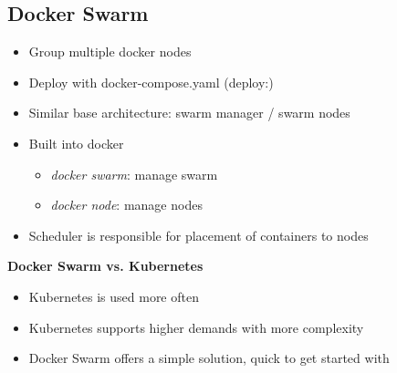 \subsection{Docker Swarm}
\begin{itemize}
    \item Group multiple docker nodes
    \item Deploy with docker-compose.yaml (deploy:)
    \item Similar base architecture: swarm manager / swarm nodes
    \item Built into docker
    \begin{itemize}
        \item \textit{docker swarm}: manage swarm
        \item \textit{docker node}: manage nodes
    \end{itemize}
    \item Scheduler is responsible for placement of containers to nodes
\end{itemize}
\textbf{Docker Swarm vs. Kubernetes}
\begin{itemize}
    \item Kubernetes is used more often
    \item Kubernetes supports higher demands with more complexity
    \item Docker Swarm offers a simple solution, quick to get started with
\end{itemize}